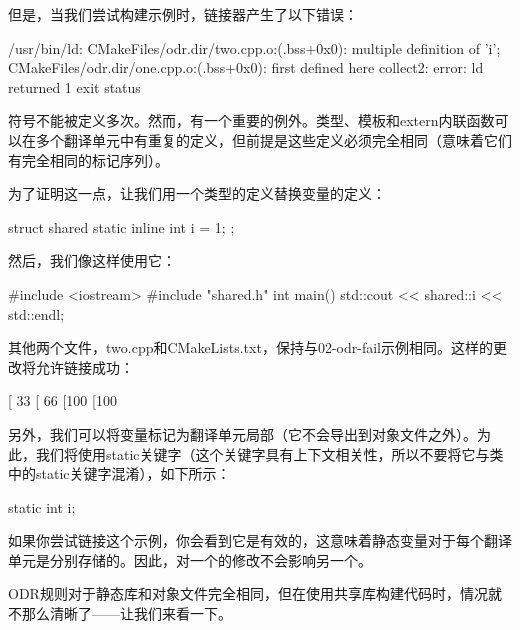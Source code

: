 但是，当我们尝试构建示例时，链接器产生了以下错误：

\begin{shell}
/usr/bin/ld:
CMakeFiles/odr.dir/two.cpp.o:(.bss+0x0): multiple definition of 'i';
CMakeFiles/odr.dir/one.cpp.o:(.bss+0x0): first defined here
collect2: error: ld returned 1 exit status
\end{shell}

符号不能被定义多次。然而，有一个重要的例外。类型、模板和extern内联函数可以在多个翻译单元中有重复的定义，但前提是这些定义必须完全相同（意味着它们有完全相同的标记序列）。

为了证明这一点，让我们用一个类型的定义替换变量的定义：


\begin{cpp}
struct shared {
    static inline int i = 1;
};
\end{cpp}

然后，我们像这样使用它：


\begin{cpp}
#include <iostream>
#include "shared.h"
int main() {
    std::cout << shared::i << std::endl;
}
\end{cpp}

其他两个文件，two.cpp和CMakeLists.txt，保持与02-odr-fail示例相同。这样的更改将允许链接成功：

\begin{shell}
[ 33%
[ 66%
[100%
[100%
\end{shell}

另外，我们可以将变量标记为翻译单元局部（它不会导出到对象文件之外）。为此，我们将使用static关键字（这个关键字具有上下文相关性，所以不要将它与类中的static关键字混淆），如下所示：


\begin{cpp}
static int i;
\end{cpp}

如果你尝试链接这个示例，你会看到它是有效的，这意味着静态变量对于每个翻译单元是分别存储的。因此，对一个的修改不会影响另一个。

ODR规则对于静态库和对象文件完全相同，但在使用共享库构建代码时，情况就不那么清晰了——让我们来看一下。

